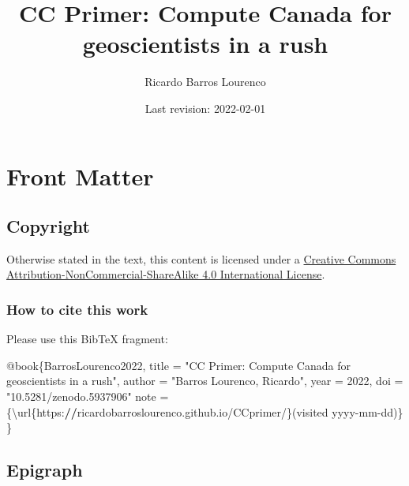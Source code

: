 \documentclass[
]{book}
\title{CC Primer: Compute Canada for geoscientists in a rush}
\author{Ricardo Barros Lourenco}
\date{Last revision: 2022-02-01}
\newenvironment{Shaded}{\begin{snugshade}}{\end{snugshade}}
\newcommand{\DecValTok}[1]{\textcolor[rgb]{0.00,0.00,0.81}{#1}}
\newcommand{\ErrorTok}[1]{\textcolor[rgb]{0.64,0.00,0.00}{\textbf{#1}}}
\newcommand{\NormalTok}[1]{#1}
\newcommand{\OtherTok}[1]{\textcolor[rgb]{0.56,0.35,0.01}{#1}}
\newcommand{\SpecialCharTok}[1]{\textcolor[rgb]{0.00,0.00,0.00}{#1}}
\newcommand{\StringTok}[1]{\textcolor[rgb]{0.31,0.60,0.02}{#1}}
\begin{document}
\maketitle

{
\setcounter{tocdepth}{1}
\tableofcontents
}
\hypertarget{front-matter}{%
\chapter{Front Matter}\label{front-matter}}

\hypertarget{copyright}{%
\section{Copyright}\label{copyright}}

Otherwise stated in the text, this content is licensed under a \href{http://creativecommons.org/licenses/by-nc-sa/4.0/}{Creative Commons Attribution-NonCommercial-ShareAlike 4.0 International License}.

\hypertarget{how-to-cite-this-work}{%
\subsection{How to cite this work}\label{how-to-cite-this-work}}

Please use this BibTeX fragment:

\begin{Shaded}
\begin{Highlighting}[]
\SpecialCharTok{@}\NormalTok{book\{BarrosLourenco2022,}
\NormalTok{  title     }\OtherTok{=} \StringTok{"CC Primer: Compute Canada for geoscientists in a rush"}\NormalTok{,}
\NormalTok{  author    }\OtherTok{=} \StringTok{"Barros Lourenco, Ricardo"}\NormalTok{,}
\NormalTok{  year      }\OtherTok{=} \DecValTok{2022}\NormalTok{,}
\NormalTok{  doi       }\OtherTok{=} \StringTok{"10.5281/zenodo.5937906"}
\NormalTok{  note      }\OtherTok{=}\NormalTok{ \{\textbackslash{}url\{https}\SpecialCharTok{:}\ErrorTok{//}\NormalTok{ricardobarroslourenco.github.io}\SpecialCharTok{/}\NormalTok{CCprimer}\SpecialCharTok{/}\NormalTok{\}(visited yyyy}\SpecialCharTok{{-}}\NormalTok{mm}\SpecialCharTok{{-}}\NormalTok{dd)\}}
\NormalTok{\}}
\end{Highlighting}
\end{Shaded}

\hypertarget{epigraph}{%
\section{Epigraph}\label{epigraph}}
\end{document}
